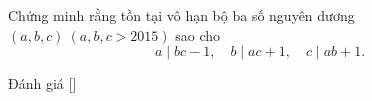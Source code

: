 \ifshowproblem
\begin{problem}\label{problem:CHN-2015-NML-P8}
    Chứng minh rằng tồn tại vô hạn bộ ba số nguyên dương $(a,b,c)\ (a,b,c > 2015)$ sao cho
    \[ a \mid bc - 1,\quad b \mid ac + 1,\quad c \mid ab + 1. \]
\end{problem}
\fi

\ifshowinfo
Đánh giá [\textbf{}]\footnotemark
{}
\fi